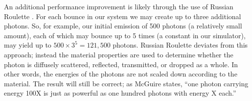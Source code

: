 \documentclass[%
        final,
        notitlepage,
        narroweqnarray,
        inline,
        twoside,
        ]{ieee}
\begin{document}
An additional performance improvement is likely through the use of
Russian Roulette \cite{Jensen96globalillumination}\cite{Russian}.  For each
bounce in our
system we may create up to three additional photons.  So, for example, our
initial emission of 500 photons (a relatively small amount), each of which may
bounce up to 5 times (a constant in our simulator), may yield up
to $500 \times 3^5 = 121,500$ photons.  Russian Roulette deviates from this
approach; instead the material properties are used to determine whether the
photon is diffusely scattered, reflected, transmitted, or dropped as a whole.
In other words, the energies of the photons are not scaled down according to
the material.  The result will still be correct; as McGuire states,
``one photon carrying energy 100X is just as powerful as one hundred photons
with energy X each.''\cite{Russian}





\end{document}
